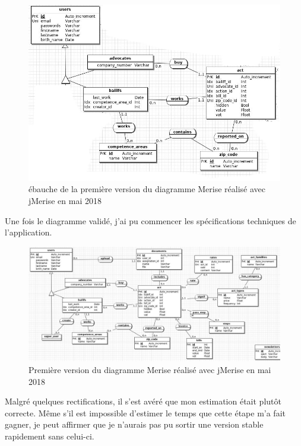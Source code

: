 \documentclass[]{report}
\begin{document}
      \begin{figure}
        \includegraphics[width=\linewidth]{img/merise_zoom.png}
        \caption{ébauche de la première version du diagramme Merise réalisé avec jMerise en mai 2018}
        \label{fig:merise_zoom}
      \end{figure}

      Une fois le diagramme validé, j'ai pu commencer les spécifications techniques de l'application.

      \begin{figure}
        \includegraphics[width=\linewidth]{img/merise.png}
        \caption{Première version du diagramme Merise réalisé avec jMerise en mai 2018}
        \label{fig:merise}
      \end{figure}

    \begin{tcolorbox}
      Malgré quelques rectifications, il s'est avéré que mon estimation était plutôt correcte. Même s'il est impossible d'estimer le temps que cette étape m'a fait gagner, je peut affirmer que je n'aurais pas pu sortir une version stable rapidement sans celui-ci.
    \end{tcolorbox}
\end{document}
